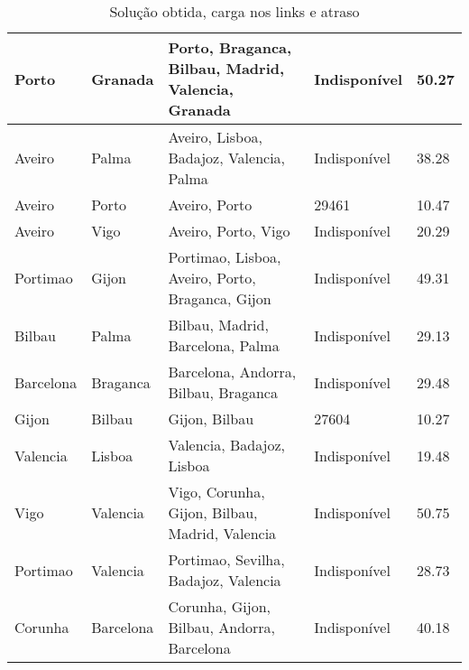 \begin{table}[!htb]
{\begin{tabular}{|l|l|l|l|l|}
Porto & Granada & Porto, Braganca, Bilbau, Madrid, Valencia, Granada & Indisponível & 50.27 \\ \hline
Aveiro & Palma & Aveiro, Lisboa, Badajoz, Valencia, Palma & Indisponível & 38.28 \\ \hline
Aveiro & Porto & Aveiro, Porto & 29461 & 10.47 \\ \hline
Aveiro & Vigo & Aveiro, Porto, Vigo & Indisponível & 20.29 \\ \hline
Portimao & Gijon & Portimao, Lisboa, Aveiro, Porto, Braganca, Gijon & Indisponível & 49.31 \\ \hline
Bilbau & Palma & Bilbau, Madrid, Barcelona, Palma & Indisponível & 29.13 \\ \hline
Barcelona & Braganca & Barcelona, Andorra, Bilbau, Braganca & Indisponível & 29.48 \\ \hline
Gijon & Bilbau & Gijon, Bilbau & 27604 & 10.27 \\ \hline
Valencia & Lisboa & Valencia, Badajoz, Lisboa & Indisponível & 19.48 \\ \hline
Vigo & Valencia & Vigo, Corunha, Gijon, Bilbau, Madrid, Valencia & Indisponível & 50.75 \\ \hline
Portimao & Valencia & Portimao, Sevilha, Badajoz, Valencia & Indisponível & 28.73 \\ \hline
Corunha & Barcelona & Corunha, Gijon, Bilbau, Andorra, Barcelona & Indisponível & 40.18 \\ \hline
\end{tabular}}
\caption[]{Solução obtida, carga nos links e atraso}
\end{table}


